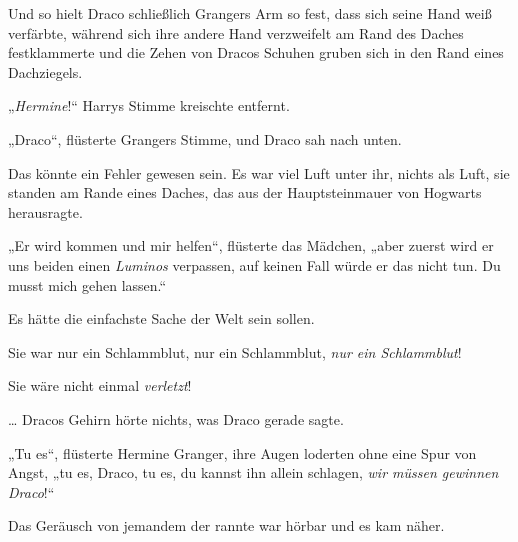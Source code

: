 Und so hielt Draco schließlich Grangers Arm so fest, dass sich seine Hand weiß verfärbte, während sich ihre andere Hand verzweifelt am Rand des Daches festklammerte und die Zehen von Dracos Schuhen gruben sich in den Rand eines Dachziegels.

„\emph{Hermine}!“ Harrys Stimme kreischte entfernt.

„Draco“, flüsterte Grangers Stimme, und Draco sah nach unten.

Das könnte ein Fehler gewesen sein. Es war viel Luft unter ihr, nichts als Luft, sie standen am Rande eines Daches, das aus der Hauptsteinmauer von Hogwarts herausragte.

„Er wird kommen und mir helfen“, flüsterte das Mädchen, „aber zuerst wird er uns beiden einen \emph{Luminos} verpassen, auf keinen Fall würde er das nicht tun. Du musst mich gehen lassen.“

Es hätte die einfachste Sache der Welt sein sollen.

Sie war nur ein Schlammblut, nur ein Schlammblut, \emph{nur ein Schlammblut}!

Sie wäre nicht einmal \emph{verletzt}!

… Dracos Gehirn hörte nichts, was Draco gerade sagte.

„Tu es“, flüsterte Hermine Granger, ihre Augen loderten ohne eine Spur von Angst, „tu es, Draco, tu es, du kannst ihn allein schlagen, \emph{wir müssen gewinnen Draco}!“

Das Geräusch von jemandem der rannte war hörbar und es kam näher.


